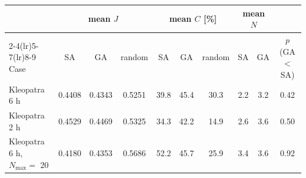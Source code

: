 \begin{tabular}{@{}lccccccccc@{}}
\toprule
 & \multicolumn{3}{c}{mean $J$} & \multicolumn{3}{c}{mean $C$ [\%]} & \multicolumn{2}{c}{mean $N$} & \\
\cmidrule(lr){2-4}\cmidrule(lr){5-7}\cmidrule(lr){8-9}
Case & SA & GA & random & SA & GA & random & SA & GA & $p$ (GA $<$ SA) \\
\midrule
Kleopatra 6 h & 0.4408 & 0.4343 & 0.5251 & 39.8 & 45.4 & 30.3 & 2.2 & 3.2 & 0.42 \\
Kleopatra 2 h & 0.4529 & 0.4469 & 0.5325 & 34.3 & 42.2 & 14.9 & 2.6 & 3.6 & 0.50 \\
Kleopatra 6 h, $N_{\max}=$ 20 & 0.4180 & 0.4353 & 0.5686 & 52.2 & 45.7 & 25.9 & 3.4 & 3.6 & 0.92 \\
\bottomrule
\end{tabular}
